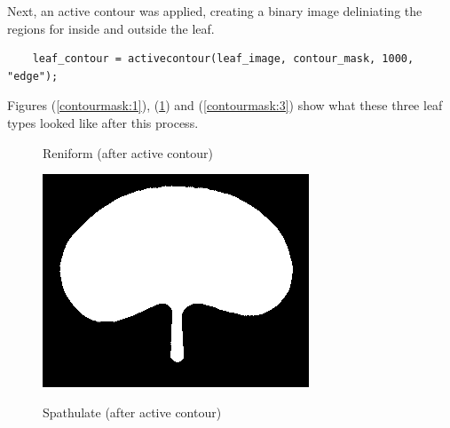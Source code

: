 \documentclass[12pt,english]{article}
\begin{document}
Next, an active contour was applied, creating a binary image deliniating the regions
for inside and outside the leaf.
\begin{verbatim}
    leaf_contour = activecontour(leaf_image, contour_mask, 1000, "edge");
\end{verbatim}
Figures (\ref{contourmask:1}), (\ref{contourmask:2}) and (\ref{contourmask:3}) show what these three leaf types looked like after
this process.
\begin{figure}[!hbt]
\begin{centre}
	\begin{minipage}{0.32\textwidth}
		\caption{Reniform (after active contour)}
		\label{contourmask:1}
		\includegraphics[width=\textwidth]{../code/contour/contour_mask/reniform}
	\end{minipage}
	\begin{minipage}{0.32\textwidth}
		\caption{Spathulate (after active contour)}
		\label{contourmask:2}

\end{minipage}
\end{centre}
\end{figure}
\end{document}
